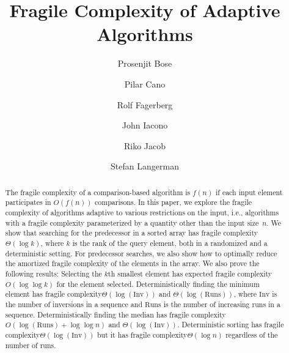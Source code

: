 \documentclass[runningheads]{llncs}
\newcommand{\frag}{fragile complexity\xspace}
\newcommand{\INV}{\ensuremath{\mathrm{Inv}}}
\newcommand{\RUNS}{\ensuremath{\mathrm{Runs}}}
\begin{document}
%
\title{Fragile Complexity of Adaptive Algorithms}
%
%
\author{Prosenjit Bose \and
Pilar Cano \and
Rolf Fagerberg\and
John Iacono\and
Riko Jacob\and
Stefan Langerman}
%
%
%
\maketitle              %
%
\begin{abstract}
  The \frag of a comparison-based algorithm is $f(n)$ if each input
  element participates in $O(f(n))$ comparisons.
  In this paper, we explore the \frag of algorithms adaptive to
  various restrictions on the input, i.e., algorithms with a \frag
  parameterized by a quantity other than the input size~$n$.  We show
  that searching for the predecessor in a sorted array has \frag
  $\Theta(\log k)$, where $k$ is the rank of the query element, both
  in a randomized and a deterministic setting. For predecessor
  searches, we also show how to optimally reduce the amortized \frag
  of the elements in the array. We also prove the following results:
  Selecting the $k$th smallest element has expected \frag
  $O(\log\log k)$ for the element selected.  Deterministically finding
  the minimum element has \frag $\Theta(\log(\INV))$ and
  $\Theta(\log(\RUNS))$, where $\INV$ is the number of inversions in a
  sequence and $\RUNS$ is the number of increasing runs in a sequence.
  Deterministically finding the median has \frag
  $O(\log(\RUNS) + \log\log n)$ and $\Theta(\log (\INV))$.
  Deterministic sorting has \frag $\Theta(\log (\INV))$ but it has
  \frag $\Theta(\log n)$ regardless of the number of runs.
 
\end{abstract}
\end{document}
